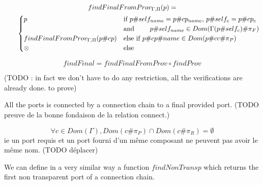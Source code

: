\begin{multline*}findFinalFromProv_{\Gamma,\Pi}(p) =\\
\qquad \begin{cases}
p &\text{if $p\#self_{name} = p\#cp_{name}$, $p\#self_c = p\#cp_c $}\\
& \text{and $\qquad p\#self_{name}\in Dom(\Gamma(p\#self_c) \#\pi_F)$} \\
findFinalFromProv_{\Gamma,\Pi}(p\#cp) &\text{else if $p\#cp\#name \in Dom(p\#cc\#\pi_P)$}\\
\otimes & \text{else}
\end{cases}
\end{multline*}

\[findFinal = findFinalFromProv \circ findProv\]

(TODO : in fact we don't have to do any restriction, all the verifications are already done. to prove)


\begin{inv}
All the ports is connected by a connection chain to a final provided port.
(TODO preuve de la bonne fondaison de la relation connect.)\end{inv}

\begin{inv}
\[\forall c \in Dom(\Gamma), Dom(c\#\pi_P)\cap Dom(c\#\pi_R)  = \emptyset\] ie un port requis et un port fourni d'un même composant ne peuvent pas avoir le même nom. (TODO déplacer)
\end{inv}

We can define in a very similar way a function $findNonTransp$ which returns the first non transparent port of a connection chain.



